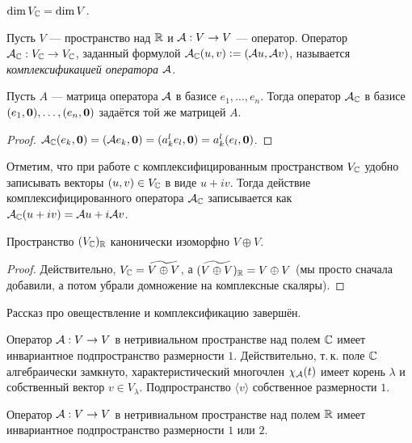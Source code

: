 \begin{corollary}
    $\dim V_{\mathbb{C}} = \dim V$.
\end{corollary}

\begin{definition}
    Пусть $V$ --- пространство над $\mathbb{R}$ и $\mathcal{A}: V \to V$ --- оператор. Оператор $\mathcal{A}_{\mathbb{C}}: V_{\mathbb{C}} \to V_{\mathbb{C}}$, заданный формулой $\mathcal{A}_{\mathbb{C}}(u, v) \vcentcolon = (\mathcal{A} u, \mathcal{A} v)$, называется \textit{комплексификацией оператора} $\mathcal{A}$.
\end{definition}

\begin{proposal}
    Пусть $A$ --- матрица оператора $\mathcal{A}$ в базисе $e_1, \ldots, e_n$. Тогда оператор $\mathcal{A}_{\mathbb{C}}$ в базисе $(e_1, \boldsymbol{0}), \ldots, (e_n, \boldsymbol{0})$ задаётся той же матрицей $A$.
\end{proposal}

\begin{proof}
    $\mathcal{A}_{\mathbb{C}}(e_k, \boldsymbol{0}) = (\mathcal{A} e_k, \boldsymbol{0}) = (a^l_ke_l, \boldsymbol{0}) = a^l_k(e_l, \boldsymbol{0})$.
\end{proof}

Отметим, что при работе с комплексифицированным пространством $V_{\mathbb{C}}$ удобно записывать векторы $(u, v) \in V_{\mathbb{C}}$ в виде $u + iv$. Тогда действие комплексифицированного оператора $\mathcal{A}_{\mathbb{C}}$ записывается как $\mathcal{A}_{\mathbb{C}}(u + iv) = \mathcal{A} u + i\mathcal{A} v$.

\begin{proposal}
    Пространство $(V_{\mathbb{C}})_{\mathbb{R}}$ канонически изоморфно $V \oplus V$.
\end{proposal}

\begin{proof}
    Действительно, $V_{\mathbb{C}} = \widetilde{V \oplus V}$, а $(\widetilde{V \oplus V})_{\mathbb{R}} = V \oplus V$ (мы просто сначала добавили, а потом убрали домножение на комплексные скаляры).
\end{proof}

Рассказ про овеществление и комплексификацию завершён.

Оператор $\mathcal{A}: V \to V$ в нетривиальном пространстве над полем $\mathbb{C}$ имеет инвариантное подпространство размерности $1$. Действительно, т.\,к. поле $\mathbb{C}$ алгебраически замкнуто, характеристический многочлен $\chi_{\mathcal{A}}(t)$ имеет корень $\lambda$ и собственный вектор $v \in V_\lambda$. Подпространство $\langle v\rangle$ собственное размерности $1$.

\begin{theorem}
    Оператор $\mathcal{A}: V \to V$ в нетривиальном пространстве над полем $\mathbb{R}$ имеет инвариантное подпространство размерности $1$ или $2$.
\end{theorem}

